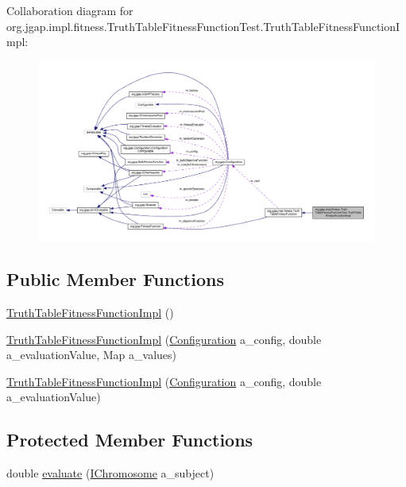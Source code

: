 Collaboration diagram for org.\-jgap.\-impl.\-fitness.\-Truth\-Table\-Fitness\-Function\-Test.\-Truth\-Table\-Fitness\-Function\-Impl\-:
\nopagebreak
\begin{figure}[H]
\begin{center}
\leavevmode
\includegraphics[width=350pt]{classorg_1_1jgap_1_1impl_1_1fitness_1_1_truth_table_fitness_function_test_1_1_truth_table_fitness_function_impl__coll__graph}
\end{center}
\end{figure}
\subsection*{Public Member Functions}
\begin{DoxyCompactItemize}
\item 
\hyperlink{classorg_1_1jgap_1_1impl_1_1fitness_1_1_truth_table_fitness_function_test_1_1_truth_table_fitness_function_impl_a8928b8bea991d95ef116166221e5ff4e}{Truth\-Table\-Fitness\-Function\-Impl} ()
\item 
\hyperlink{classorg_1_1jgap_1_1impl_1_1fitness_1_1_truth_table_fitness_function_test_1_1_truth_table_fitness_function_impl_a5966b6746f4803b21fcbd017fa7152b0}{Truth\-Table\-Fitness\-Function\-Impl} (\hyperlink{classorg_1_1jgap_1_1_configuration}{Configuration} a\-\_\-config, double a\-\_\-evaluation\-Value, Map a\-\_\-values)
\item 
\hyperlink{classorg_1_1jgap_1_1impl_1_1fitness_1_1_truth_table_fitness_function_test_1_1_truth_table_fitness_function_impl_a2570217b7300c7ac73e01a2c4704c2c9}{Truth\-Table\-Fitness\-Function\-Impl} (\hyperlink{classorg_1_1jgap_1_1_configuration}{Configuration} a\-\_\-config, double a\-\_\-evaluation\-Value)
\end{DoxyCompactItemize}
\subsection*{Protected Member Functions}
\begin{DoxyCompactItemize}
\item 
double \hyperlink{classorg_1_1jgap_1_1impl_1_1fitness_1_1_truth_table_fitness_function_test_1_1_truth_table_fitness_function_impl_ada3bae7de32db125a917447b1680482f}{evaluate} (\hyperlink{interfaceorg_1_1jgap_1_1_i_chromosome}{I\-Chromosome} a\-\_\-subject)
\end{DoxyCompactItemize}
